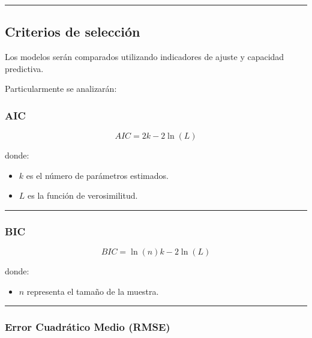 \documentclass[11pt]{article}
\providecommand{\tightlist}{%
      \setlength{\itemsep}{0pt}\setlength{\parskip}{0pt}}
\begin{document}
\begin{center}\rule{0.5\linewidth}{0.5pt}\end{center}

\hypertarget{criterios-de-selecciuxf3n}{%
\subsection{Criterios de selección}\label{criterios-de-selecciuxf3n}}

Los modelos serán comparados utilizando indicadores de ajuste y
capacidad predictiva.

Particularmente se analizarán:

\hypertarget{aic}{%
\subsubsection{AIC}\label{aic}}

\[
AIC = 2k - 2\ln(L)
\]

donde:

\begin{itemize}
\tightlist
\item
  \(k\) es el número de parámetros estimados.
\item
  \(L\) es la función de verosimilitud.
\end{itemize}

\begin{center}\rule{0.5\linewidth}{0.5pt}\end{center}

\hypertarget{bic}{%
\subsubsection{BIC}\label{bic}}

\[
BIC = \ln(n)k - 2\ln(L)
\]

donde:

\begin{itemize}
\tightlist
\item
  \(n\) representa el tamaño de la muestra.
\end{itemize}

\begin{center}\rule{0.5\linewidth}{0.5pt}\end{center}

\hypertarget{error-cuadruxe1tico-medio-rmse}{%
\subsubsection{Error Cuadrático Medio
(RMSE)}\label{error-cuadruxe1tico-medio-rmse}}
\end{document}
